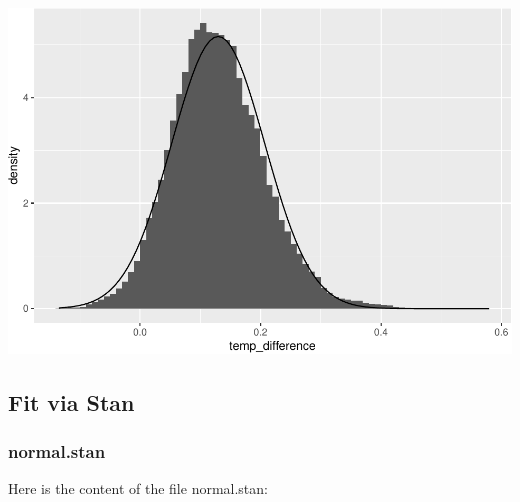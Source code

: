 \documentclass[]{article}
\begin{document}
\includegraphics{20190225_bayes_MCMC_Metropolis_files/figure-latex/unnamed-chunk-12-1.pdf}

\subsection{Fit via Stan}\label{fit-via-stan}

\subsubsection{normal.stan}\label{normal.stan}

Here is the content of the file normal.stan:
\end{document}

